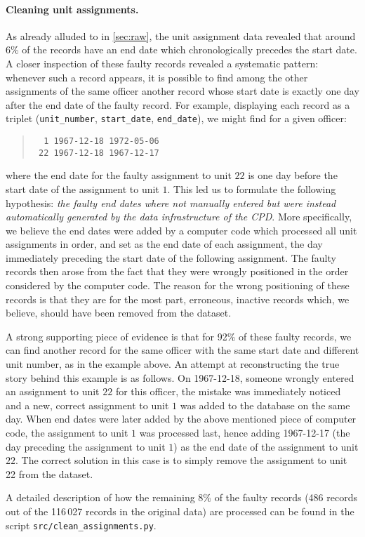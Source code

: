 \paragraph{Cleaning unit assignments.}
As already alluded to in \cref{sec:raw}, the unit assignment data revealed that
around 6\% of the records have an end date which chronologically precedes the
start date. A closer inspection of these faulty records revealed a systematic
pattern: whenever such a record appears, it is possible to find among the other
assignments of the same officer another record whose start date is exactly one
day after the end date of the faulty record. For example, displaying each
record as a triplet (\texttt{unit\_number}, \texttt{start\_date},
\texttt{end\_date}), we might find for a given officer:
\begin{quote}
\begin{verbatim}
  1 1967-12-18 1972-05-06
 22 1967-12-18 1967-12-17
\end{verbatim}
\end{quote}
where the end date for the faulty assignment to unit $22$ is one day before the
start date of the assignment to unit $1$. This led us to formulate the
following hypothesis: \emph{the faulty end dates where not manually entered but
were instead automatically generated by the data infrastructure of the CPD}.
More specifically, we believe the end dates were added by a computer code which
processed all unit assignments in order, and set as the end date of each
assignment, the day immediately preceding the start date of the following
assignment. The faulty records then arose from the fact that they were wrongly
positioned in the order considered by the computer code. The reason for the
wrong positioning of these records is that they are for the most part,
erroneous, inactive records which, we believe, should have been removed from
the dataset.

A strong supporting piece of evidence is that for 92\% of these faulty records,
we can find another record for the same officer with the same start date and
different unit number, as in the example above. An attempt at reconstructing the
true story behind this example is as follows. On 1967-12-18, someone
wrongly entered an assignment to unit $22$ for this officer, the mistake was
immediately noticed and a new, correct assignment to unit $1$ was added to the
database on the same day. When end dates were later added by the above
mentioned piece of computer code, the assignment to unit $1$ was processed
last, hence adding 1967-12-17 (the day preceding the assignment to unit $1$) as
the end date of the assignment to unit $22$. The correct solution in this case
is to simply remove the assignment to unit 22 from the dataset.

A detailed description of how the remaining 8\% of the faulty records (486
records out of the 116\,027 records in the original data) are processed can be
found in the script \texttt{src/clean\_assignments.py}.
